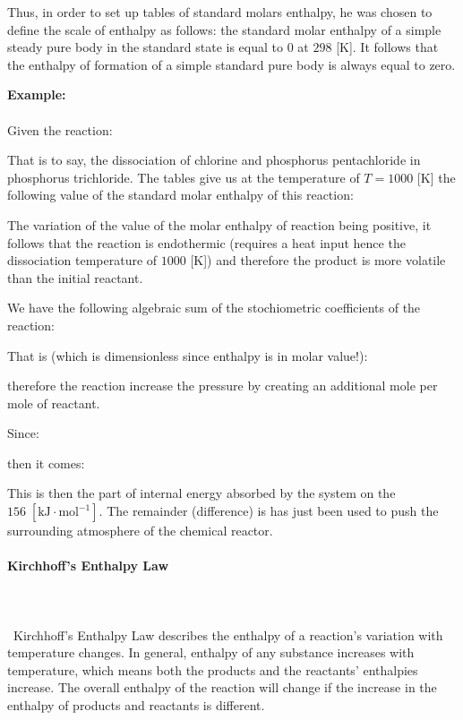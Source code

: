 	Thus, in order to set up tables of standard molars enthalpy, he was chosen to define the scale of enthalpy as follows: the standard molar enthalpy of a simple steady pure body in the standard state is equal to $0$ at $298$ [K]. It follows that the enthalpy of formation of a simple standard pure body is always equal to zero.
	\begin{tcolorbox}[colframe=black,colback=white,sharp corners]
	\textbf{{\Large {}}Example:}\\\\
	Given the reaction:
	
	That is to say, the dissociation of chlorine and phosphorus pentachloride in phosphorus trichloride. The tables give us at the temperature of $T=1000$ [K] the following value of the standard molar enthalpy of this reaction:
	
	The variation of the value of the molar enthalpy of reaction being positive, it follows that the reaction is endothermic (requires a heat input hence the dissociation temperature of $1000$ [K]) and therefore the product is more volatile than the initial reactant.

	We have the following algebraic sum of the stochiometric coefficients of the reaction:
	
	That is (which is dimensionless since enthalpy is in molar value!):
	
	therefore the reaction increase the pressure by creating an additional mole per mole of reactant.

	Since:
	
	\end{tcolorbox}
	
	\begin{tcolorbox}[colframe=black,colback=white,sharp corners]
	then it comes:
	
	This is then the part of internal energy absorbed by the system on the $156 \;[\text{kJ}\cdot \text{mol}^{-1}]$. The remainder (difference) is has just been used to push the surrounding atmosphere of the chemical reactor.
	\end{tcolorbox}
	
	\paragraph{Kirchhoff's Enthalpy Law}\mbox{}\\\\\
	Kirchhoff's Enthalpy Law describes the enthalpy of a reaction's variation with temperature changes. In general, enthalpy of any substance increases with temperature, which means both the products and the reactants' enthalpies increase. The overall enthalpy of the reaction will change if the increase in the enthalpy of products and reactants is different.
	
